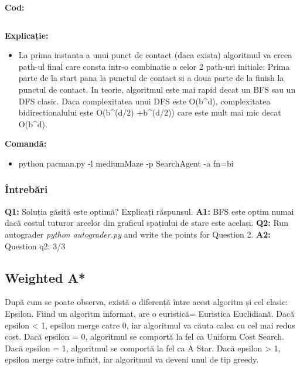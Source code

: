 \textbf{Cod:}
\inputminted[linenos]{python}{code/05_bi.py}

\pagebreak
\textbf{Explicație:}
\begin{itemize}
    \setlength\itemsep{0em}
    \item La prima instanta a unui punct de contact (daca exista) algoritmul va creea path-ul final care consta intr-o combinatie a celor 2 path-uri initiale: Prima parte de la start pana la punctul de contact si a doua parte de la finish la punctul de contact.
In teorie, algoritmul este mai rapid decat un BFS sau un DFS clasic. Daca complexitatea unui DFS este O(b^d), complexitatea bidirectionalului este O(b^(d/2) +b^(d/2)) care este mult mai mic decat O(b^d).

\end{itemize}


\textbf{Comandă:}
\begin{itemize}
    \setlength\itemsep{0em}
    \item python pacman.py -l mediumMaze -p SearchAgent -a fn=bi
        
\end{itemize}

\subsubsection{Întrebări}

\textbf{Q1:} Soluția găsită este optimă? Explicați răspunsul.
\newline
\textbf{A1:} BFS este optim numai dacă costul tuturor arcelor din graficul spațiului de stare este același.
\newline
\newline
\textbf{Q2:} Run autograder \textit{python autograder.py} and write the points for Question 2.
\newline
\textbf{A2:} Question q2: 3/3
\newline
\vspace{0.75cm}
\pagebreak



\subsection{Weighted A*}
După cum se poate observa, există o diferență între acest algoritm și cel clasic: Epsilon. Fiind un algoritm informat, are o euristică= Euristica Euclidiană.\newline
Dacă epsilon < 1, epsilon merge catre 0, iar algoritmul va căuta calea cu cel mai redus cost.
Dacă epsilon = 0, algoritmul se comportă la fel ca Uniform Cost Search.
Dacă epsilon = 1, algoritmul se comportă la fel ca A Star.
Dacă epsilon > 1, epsilon merge catre infinit, iar algoritmul va deveni unul de tip greedy.\newline

